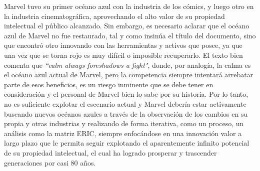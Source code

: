 \documentclass[letterpaper,12pt,oneside]{article}
\begin{document}
Marvel tuvo su primer océano azul con la industria de los cómics, y luego otro en la industria cinematográfica, aprovechando el alto valor de su propiedad intelectual el público alcanzado. Sin embargo, es necesario aclarar que el océano azul de Marvel no fue restaurado, tal y como insinúa el título del documento, sino que encontró otro innovando con las herramientas y activos que posee, ya que una vez que se torna rojo es muy difícil o imposible recuperarlo. El texto bien comenta que \textit{``calm always foreshadows a fight"}, donde, por analogía, la calma es el océano azul actual de Marvel, pero la competencia siempre intentará arrebatar parte de esos beneficios, es un riesgo inminente que se debe tener en consideración y el personal de Marvel bien lo sabe por su historia. Por lo tanto, no es suficiente explotar el escenario actual y Marvel debería estar activamente buscando nuevos océanos azules a través de la observación de los cambios en su propia y otras industrias y realizando de forma iterativa, como un proceso, un análisis como la matriz ERIC, siempre enfocándose en una innovación valor a largo plazo que le permita seguir explotando el aparentemente infinito potencial de su propiedad intelectual, el cual ha logrado prosperar y trascender generaciones por casi 80 años.
\end{document}
